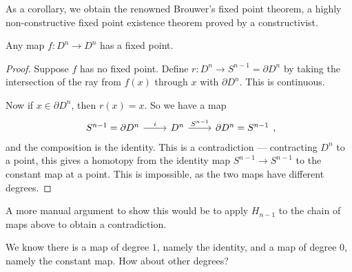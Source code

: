 \documentclass[a4paper]{article}
\theoremstyle{definition}
\begin{document}
As a corollary, we obtain the renowned Brouwer's fixed point theorem, a highly non-constructive fixed point existence theorem proved by a constructivist.
\begin{cor}
  Any map $f: D^n \to D^n$ has a fixed point.
\end{cor}

\begin{proof}
  Suppose $f$ has no fixed point. Define $r: D^n \to S^{n - 1} = \partial D^n$ by taking the intersection of the ray from $f(x)$ through $x$ with $\partial D^n$. This is continuous.
  \begin{center}
  \end{center}
  Now if $x \in \partial D^n$, then $r(x) = x$. So we have a map
  \[
    \begin{tikzcd}
      S^{n - 1} = \partial D^n \ar[r, "i"] & D^n \ar[r, "S^{n - 1}"] & \partial D^n = S^{n - 1}
    \end{tikzcd},
  \]
  and the composition is the identity. This is a contradiction --- contracting $D^n$ to a point, this gives a homotopy from the identity map $S^{n - 1} \to S^{n - 1}$ to the constant map at a point. This is impossible, as the two maps have different degrees.
\end{proof}
A more manual argument to show this would be to apply $H_{n - 1}$ to the chain of maps above to obtain a contradiction.

We know there is a map of degree $1$, namely the identity, and a map of degree $0$, namely the constant map. How about other degrees?
\end{document}
